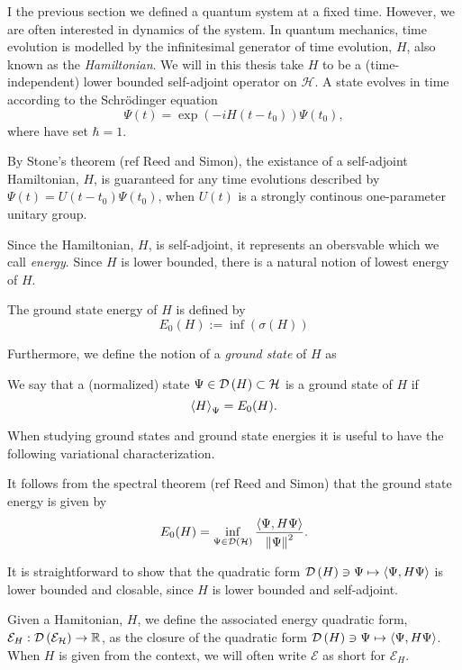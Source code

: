 I the previous section we defined a quantum system at a fixed time. However, we are often interested in dynamics of the system. In quantum mechanics, time evolution is modelled by the infinitesimal generator of time evolution, $ H $, also known as the \emph{Hamiltonian}. We will in this thesis take $ H $ to be a (time-independent) lower bounded self-adjoint operator on $ \mathcal{H} $. A state evolves in time according to the Schrödinger equation\begin{equation*}
\Psi(t)=\exp\left(-iH(t-t_0)\right)\Psi(t_0),
\end{equation*}
where have set $ \hbar=1 $.
\begin{remark}
	By Stone's theorem (ref Reed and Simon), the existance of a self-adjoint Hamiltonian, $ H $, is guaranteed for any time evolutions described by $ \Psi(t)=U(t-t_0)\Psi(t_0) $, when $ U(t) $ is a strongly continous one-parameter unitary group.
\end{remark}
Since the Hamiltonian, $ H $, is self-adjoint, it represents an obersvable which we call \emph{energy}. Since $ H $ is lower bounded, there is a natural notion of lowest energy of $ H $.
\begin{definition}
	The ground state energy of $ H $ is defined by 
	$$
	E_0(H):=\inf(\sigma(H))
	$$
\end{definition}
Furthermore, we define the notion of a \emph{ground state} of $ H $ as
\begin{definition}
	We say that a (normalized) state $ \Psi\in \mathcal D\left(H\right)\subset \mathcal{H} $ is a ground state of $ H $ if $$ \left\langle H\right\rangle_\Psi=E_0(H). $$
\end{definition}
When studying ground states and ground state energies it is useful to have the following variational characterization.
\begin{remark}\label{RemarkVariationalPrinciple1}
	It follows from the spectral theorem (ref Reed and Simon) that the ground state energy is given by \begin{equation}\label{EqVariationalGroundStateEnergyOperator}
		E_0(H)=\inf_{\Psi\in \mathcal D\left(\mathcal{H}\right)}\frac{\left\langle\Psi,H\Psi\right\rangle}{\left\lVert \Psi \right\rVert^2}.
	\end{equation}
\end{remark}
\begin{remark}
	It is straightforward to show that the quadratic form $ \mathcal D\left(H\right)\ni\Psi\mapsto\left\langle\Psi,H\Psi\right\rangle $ is lower bounded and closable, since $ H $ is lower bounded and self-adjoint.
\end{remark}
\begin{definition}
	Given a Hamitonian, $ H $, we define the associated energy quadratic form, $ \mathcal{E}_H:\mathcal{\mathcal D\left(\mathcal{E}_H\right)}\to \mathbb{R} $, as the closure of the quadratic form $ \mathcal D\left(H\right)\ni\Psi\mapsto\left\langle\Psi,H\Psi\right\rangle $. When $ H $ is given from the context, we will often write $ \mathcal{E} $ as short for $ \mathcal{E}_H $.
\end{definition}
